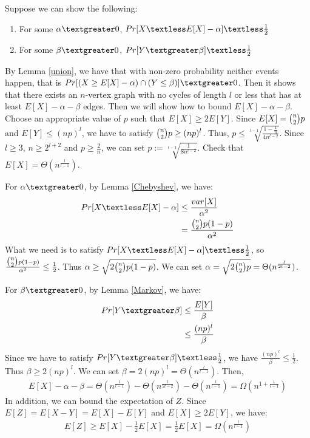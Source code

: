 Suppose we can show the following:
\begin{enumerate}
    \item For some $\alpha \textgreater 0$, $Pr[X\textless E[X]-\alpha] \textless \frac{1}{2}$
    \item For some $\beta \textgreater 0$, $Pr[Y \textgreater \beta]\textless \frac{1}{2}$
\end{enumerate}
By Lemma \ref{union}, we have that with non-zero probability neither events happen, that is $Pr[(X\ge E[X]-\alpha)\cap (Y \le \beta)]\textgreater 0$. Then it shows that there exists an $n$-vertex graph with no cycles of length $l$ or less that has at least $E[X]-\alpha-\beta$ edges. 
Then we will show how to bound $E[X]-\alpha-\beta$.
Choose an appropriate value of $p$ such that $E[X] \ge 2E[Y]$. Since $E[X]=\tbinom{n}{2}p$ and $E[Y]\le (np)^l$, we have to satisfy $\tbinom{n}{2}p \ge (np)^l$. Thus, $p\le  \sqrt[l-1]{\frac{1-\frac{1}{n}}{4n^{l-2}}}$. Since $l\ge 3$, $n\ge 2^{l+2}$ and $p\ge \frac{2}{n}$, we can set $p:=\sqrt[l-1]{\frac{1}{8n^{l-2}}}$. Check that $E[X]=\Theta (n^\frac{l}{l-1})$.%

For $\alpha \textgreater 0$, by Lemma \ref{Chebyshev}, we have:
\begin{align}
    \nonumber Pr[X\textless E[X]-\alpha] &\le \frac{var[X]}{\alpha^2}\\
    \nonumber &=\frac{\tbinom{n}{2}p(1-p)}{\alpha^2}
\end{align}
What we need is to satisfy $Pr[X\textless E[X]-\alpha] \textless \frac{1}{2}$, so $\frac{\tbinom{n}{2}p(1-p)}{\alpha^2}\le \frac{1}{2} $. Thus $\alpha \ge \sqrt{2\tbinom{n}{2}p(1-p)}$. We can set $\alpha = \sqrt{2\tbinom{n}{2}p}=\Theta(n^{\frac{l}{2l-2}})$.

For $\beta \textgreater 0$, by Lemma \ref{Markov}, we have: 
\begin{align}
    \nonumber Pr[Y \textgreater \beta] &\le \frac{E[Y]}{\beta}\\
    \nonumber & \le \frac{(np)^l}{\beta} 
\end{align}
Since we have to satisfy $Pr[Y \textgreater \beta]\textless \frac{1}{2}$, we have $\frac{(np)^l}{\beta} \le \frac{1}{2}$. Thus $\beta \ge 2(np)^l$. We can set $\beta = 2(np)^l = \Theta (n^{\frac{l}{l-1}})$.
Then,
\begin{align}
    \nonumber E[X]-\alpha-\beta = \Theta (n^\frac{l}{l-1}) - \Theta(n^{\frac{l}{2l-2}}) - \Theta (n^{\frac{l}{l-1}})=\Omega (n^{1+\frac{1}{l-1}})
\end{align}
In addition, we can bound the expectation of $Z$.
Since $E[Z]=E[X-Y]=E[X]-E[Y]$ and $E[X]\ge 2E[Y]$, we have:
\begin{align}
    \nonumber E[Z]\ge E[X]-\frac{1}{2}E[X]=\frac{1}{2}E[X]=\Omega (n^\frac{l}{l-1})
\end{align}
